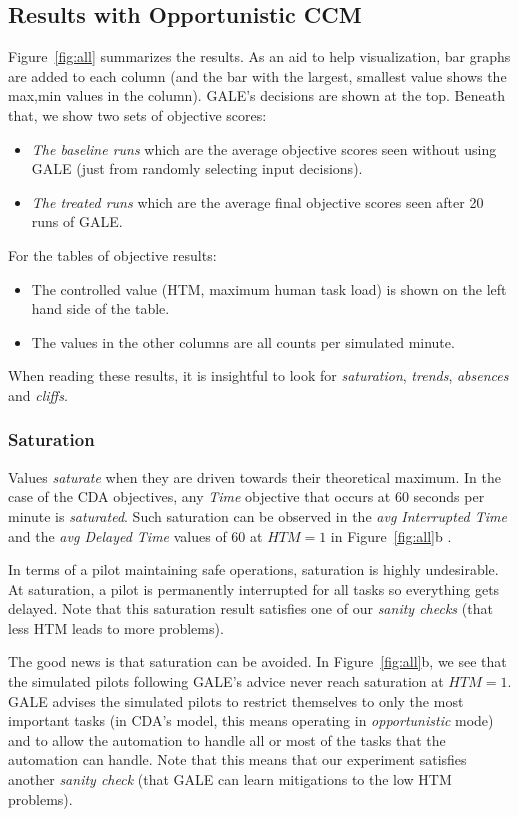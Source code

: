 \documentclass[journal]{IEEEtran}
\newcommand{\bi}{\begin{itemize}}
\newcommand{\ei}{\end{itemize}}
\newcommand{\fig}[1]{Figure~\ref{fig:#1}}
\begin{document}
\subsection{ Results with Opportunistic CCM}
\fig{all} summarizes
the results.
As an aid to help visualization, bar graphs are added to each column (and the bar with the largest, smallest value shows the max,min values in the column).
GALE's decisions are shown at the top.
Beneath that, we show two sets of objective scores:
\bi
\item {\em The baseline runs} which are the average objective scores seen without using GALE (just from randomly selecting input decisions).
\item {\em The treated runs} which are the average final objective scores seen after 20 runs of GALE.
\ei
For the tables of objective results:
\bi
\item The controlled value (HTM, maximum human task load) is shown on the left hand side of the table.
\item The values in the other columns are all counts per simulated minute.
\ei
When reading these results, it is insightful to look for {\em saturation}, {\em trends}, {\em absences} and {\em cliffs}. 


\subsubsection{Saturation}

Values {\em saturate} when they are driven towards their theoretical maximum. 
In the case of the CDA objectives, any {\em Time} objective that occurs at 60 seconds per minute is {\em saturated}. 
Such saturation can be observed in the {\em avg Interrupted Time} and the {\em avg Delayed Time} values of 60 at  $\mathit{HTM}=1$ in \fig{all}b .

In terms of a pilot maintaining safe operations, saturation is highly undesirable. At saturation, a pilot is permanently interrupted for all tasks so everything gets delayed.  
Note that this saturation result satisfies  one of our {\em sanity checks} (that less HTM leads to more problems).

The good news is that saturation can be avoided. 
In \fig{all}b, we see that the simulated pilots following GALE's advice never
reach saturation at $\mathit{HTM}=1$.
GALE advises the simulated pilots to restrict themselves to only the most important tasks (in CDA's model, this means operating in {\em opportunistic} mode) and to allow the automation to handle all or most of the tasks that the automation can handle.
Note that this  means that our experiment satisfies  another {\em sanity check} (that GALE can learn mitigations to the low HTM problems).
\end{document}
